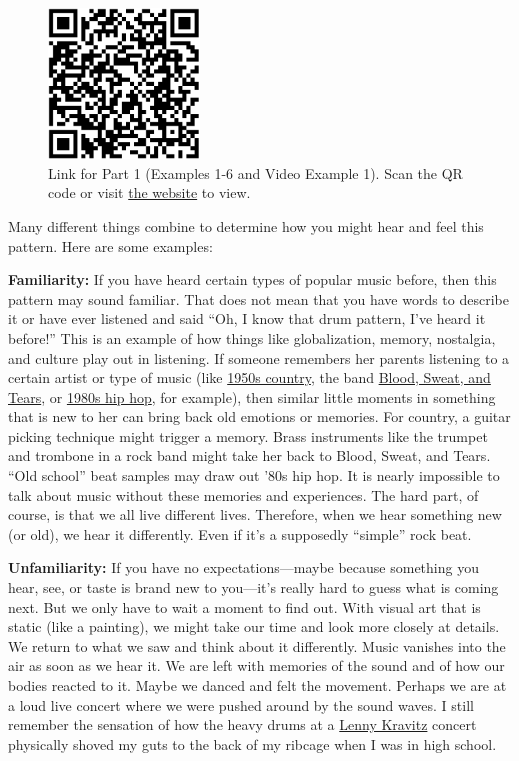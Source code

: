 \documentclass[twoside]{article}
\providecommand{\wmturlcaption}{
  Scan the QR code or visit \href{https://worldmusictextbook.org/witulski-rhythm}{the website} to view.
}
\begin{document}
\begin{figure}
  \centering
  \includegraphics[height=4cm]{witulski-rhythm-part-1.png}
  \caption*{Link for Part 1 (Examples 1-6 and Video Example 1). \wmturlcaption}
\end{figure}

Many different things combine to determine how you might hear and feel
this pattern. Here are some examples:

\textbf{Familiarity:} If you have heard certain types of popular music
before, then this pattern may sound familiar. That does not mean that
you have words to describe it or have ever listened and said ``Oh, I
know that drum pattern, I've heard it before!'' This is an example of
how things like globalization, memory, nostalgia, and culture play out
in listening. If someone remembers her parents listening to a certain
artist or type of music (like
\href{https://www.youtube.com/watch?v=bjCoKslQOEs}{1950s country}, the
band \href{https://www.youtube.com/watch?v=P5jNJd7HRVU}{Blood, Sweat,
and Tears}, or \href{https://www.youtube.com/watch?v=nyYqkRv0D5g}{1980s
hip hop}, for example), then similar little moments in something that is
new to her can bring back old emotions or memories. For country, a
guitar picking technique might trigger a memory. Brass instruments like
the trumpet and trombone in a rock band might take her back to Blood,
Sweat, and Tears. ``Old school'' beat samples may draw out '80s hip hop.
It is nearly impossible to talk about music without these memories and
experiences. The hard part, of course, is that we all live different
lives. Therefore, when we hear something new (or old), we hear it
differently. Even if it's a supposedly ``simple'' rock beat.

\textbf{Unfamiliarity:} If you have no expectations---maybe because
something you hear, see, or taste is brand new to you---it's really hard
to guess what is coming next. But we only have to wait a moment to find
out. With visual art that is static (like a painting), we might take our
time and look more closely at details. We return to what we saw and
think about it differently. Music vanishes into the air as soon as we
hear it. We are left with memories of the sound and of how our bodies
reacted to it. Maybe we danced and felt the movement. Perhaps we are at
a loud live concert where we were pushed around by the sound waves. I
still remember the sensation of how the heavy drums at a
\href{https://www.youtube.com/watch?v=8LhCd1W2V0Q}{Lenny Kravitz}
concert physically shoved my guts to the back of my ribcage when I was
in high school.
\end{document}
